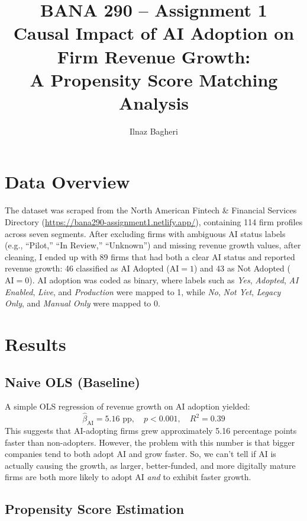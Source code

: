 \documentclass[12pt]{article}
\title{\textbf{BANA 290 -- Assignment 1} \\[6pt]
       \large Causal Impact of AI Adoption on Firm Revenue Growth:\\
       A Propensity Score Matching Analysis}
\author{Ilnaz Bagheri}
\begin{document}
\maketitle

\section{Data Overview}

The dataset was scraped from the North American Fintech \& Financial Services Directory (\url{https://bana290-assignment1.netlify.app/}), containing 114 firm profiles across seven segments. After excluding firms with ambiguous AI status labels (e.g., ``Pilot,'' ``In Review,'' ``Unknown'') and missing revenue growth values, after cleaning, I ended up with 89 firms that had both a clear AI status and reported revenue growth: 46 classified as AI Adopted ($\text{AI}=1$) and 43 as Not Adopted ($\text{AI}=0$). AI adoption was coded as binary, where labels such as \textit{Yes}, \textit{Adopted}, \textit{AI Enabled}, \textit{Live}, and \textit{Production} were mapped to 1, while \textit{No}, \textit{Not Yet}, \textit{Legacy Only}, and \textit{Manual Only} were mapped to 0.

\section{Results}

\subsection{Naive OLS (Baseline)}

A simple OLS regression of revenue growth on AI adoption yielded:
\[
  \hat{\beta}_{\text{AI}} = 5.16 \text{ pp}, \quad p < 0.001, \quad R^2 = 0.39
\]
This suggests that AI-adopting firms grew approximately 5.16 percentage points faster than non-adopters. However, the problem with this number is that bigger companies tend to both adopt AI and grow faster. So, we can't tell if AI is actually causing the growth, as larger, better-funded, and more digitally mature firms are both more likely to adopt AI \emph{and} to exhibit faster growth.

\subsection{Propensity Score Estimation}
\end{document}
